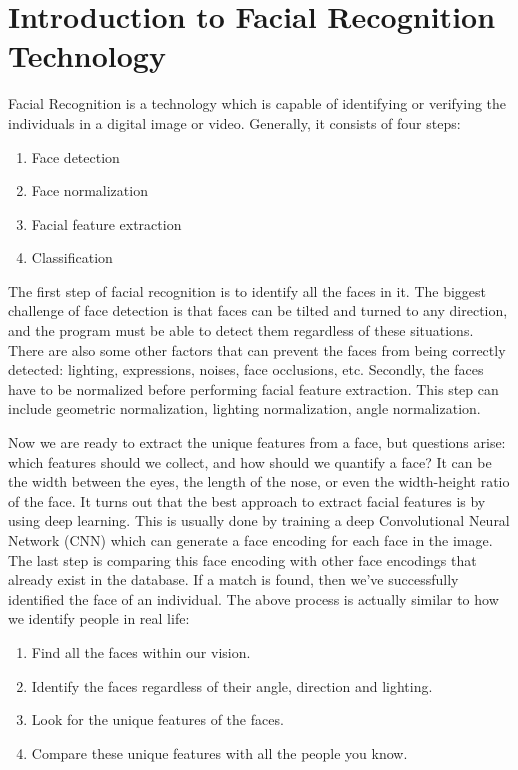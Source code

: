 \section{Introduction to Facial Recognition Technology}
Facial Recognition is a technology which is capable of identifying or verifying the individuals in a digital image or video.
Generally, it consists of four steps:

\vspace{0.5cm}
\begin{enumerate}
  \item Face detection
  \item Face normalization
  \item Facial feature extraction
  \item Classification
\end{enumerate}
\setstretch{\contentLineSpacing}

The first step of facial recognition is to identify all the faces in it. The biggest challenge of face detection
is that faces can be tilted and turned to any direction, and the program must be able to detect them regardless of
these situations. There are also some other factors that can prevent the faces from being correctly detected:
lighting, expressions, noises, face occlusions, etc. Secondly, the faces have to be normalized before performing
facial feature extraction. This step can include geometric normalization, lighting normalization, angle normalization.

Now we are ready to extract the unique features from a face, but questions arise: which features should we collect, and
how should we quantify a face? It can be the width between the eyes, the length of the nose, or even the width-height ratio
of the face. It turns out that the best approach to extract facial features is by using deep learning.
This is usually done by training a deep Convolutional Neural Network (CNN) which can generate a face encoding for each face
in the image. The last step is comparing this face encoding with other face encodings that already exist in the database.
If a match is found, then we've successfully identified the face of an individual. The above process is actually similar to
how we identify people in real life:

\vspace{0.5cm}
\begin{enumerate}
  \item Find all the faces within our vision.
  \item Identify the faces regardless of their angle, direction and lighting.
  \item Look for the unique features of the faces.
  \item Compare these unique features with all the people you know.
\end{enumerate}
\setstretch{\contentLineSpacing}


